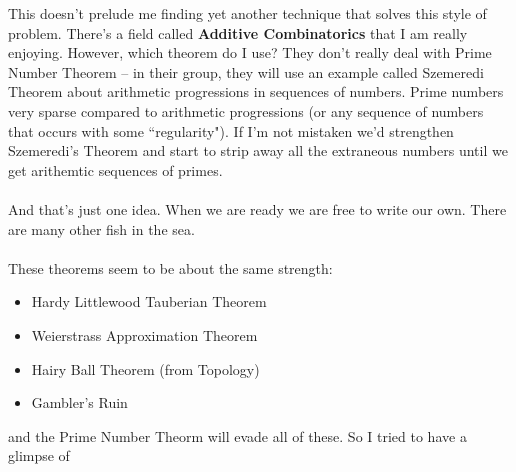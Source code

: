 \documentclass[12pt]{article}
\begin{document}
This doesn't prelude me finding yet another technique that solves this style of problem.  There's a field called \textbf{Additive Combinatorics} that I am really enjoying.  However, which theorem do I use?  They don't really deal with Prime Number Theorem -- in their group, they will use an example called {\color{red!50!green!50!blue}Szemeredi Theorem} about arithmetic progressions in sequences of numbers.  Prime numbers very sparse compared to arithmetic progressions (or any sequence of numbers that occurs with some ``regularity").  If I'm not mistaken we'd strengthen Szemeredi's Theorem and start to strip away all the extraneous numbers until we get arithemtic sequences of primes. \\ \\
And that's just one idea.    When we are ready we are free to write our own. There are many other fish in the sea. \\ \\
These theorems seem to be about the same strength:
\begin{itemize}
\item Hardy Littlewood Tauberian Theorem
\item Weierstrass Approximation Theorem
\item Hairy Ball Theorem (from Topology)
\item Gambler's Ruin
\end{itemize}
and the Prime Number Theorm will evade all of these. So I tried to have a glimpse of 

\newpage
\end{document}
